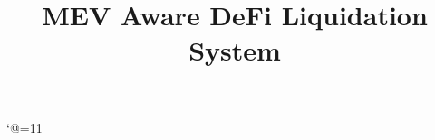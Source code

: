 \bgroup
\catcode`@=11
\gdef\getfontsize{\f@size pt}
\egroup
\providecommand{\normal}{\fontsize{12pt}{16pt}\selectfont}
\providecommand{\size}{\fontsize{14pt}{18pt}\selectfont}
\providecommand{\bigsize}{\fontsize{16pt}{20pt}\selectfont}
\providecommand{\bigbigsize}{\fontsize{20pt}{24pt}\selectfont}
\title{\bigbigsize \textbf{MEV Aware DeFi Liquidation System}}




\thispagestyle{empty}
\maketitle
\restoregeometry
\newpage

